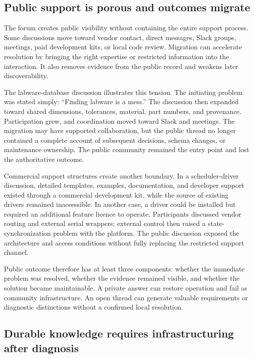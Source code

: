 \subsection{Public support is porous and outcomes migrate}

The forum creates public visibility without containing the entire support process. Some discussions move toward vendor contact, direct messages, Slack groups, meetings, paid development kits, or local code review. Migration can accelerate resolution by bringing the right expertise or restricted information into the interaction. It also removes evidence from the public record and weakens later discoverability.

The labware-database discussion illustrates this tension. The initiating problem was stated simply: ``Finding labware is a mess.'' \cite{forum_labware_database} The discussion then expanded toward shared dimensions, tolerances, material, part numbers, and provenance. Participation grew, and coordination moved toward Slack and meetings. The migration may have supported collaboration, but the public thread no longer contained a complete account of subsequent decisions, schema changes, or maintenance ownership. The public community remained the entry point and lost the authoritative outcome.

Commercial support structures create another boundary. In a scheduler-driver discussion, detailed templates, examples, documentation, and developer support existed through a commercial development kit, while the source of existing drivers remained inaccessible. In another case, a driver could be installed but required an additional feature licence to operate. Participants discussed vendor routing and external serial wrappers; external control then raised a state-synchronization problem with the platform. The public discussion exposed the architecture and access conditions without fully replacing the restricted support channel.

Public outcome therefore has at least three components: whether the immediate problem was resolved, whether the evidence remained visible, and whether the solution became maintainable. A private answer can restore operation and fail as community infrastructure. An open thread can generate valuable requirements or diagnostic distinctions without a confirmed local resolution.

\subsection{Durable knowledge requires infrastructuring after diagnosis}

